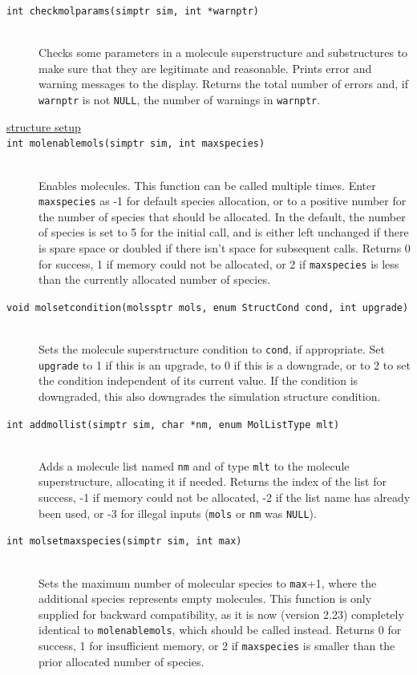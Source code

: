 \documentclass {scrbook}
\newcommand {\ttt} {\texttt}
\begin{document}
\begin{description}
\item[\ttt{int checkmolparams(simptr sim, int *warnptr)}]
\hfill \\
Checks some parameters in a molecule superstructure and substructures to make sure that they are legitimate and reasonable. Prints error and warning messages to the display. Returns the total number of errors and, if \ttt{warnptr} is not \ttt{NULL}, the number of warnings in \ttt{warnptr}.

\item[\underline{structure setup}]

\item[\ttt{int molenablemols(simptr sim, int maxspecies)}]
\hfill \\
Enables molecules. This function can be called multiple times. Enter \ttt{maxspecies} as -1 for default species allocation, or to a positive number for the number of species that should be allocated. In the default, the number of species is set to 5 for the initial call, and is either left unchanged if there is spare space or doubled if there isn't space for subsequent calls. Returns 0 for success, 1 if memory could not be allocated, or 2 if \ttt{maxspecies} is less than the currently allocated number of species.

\item[\ttt{void molsetcondition(molssptr mols, enum StructCond cond, int upgrade)}]
\hfill \\
Sets the molecule superstructure condition to \ttt{cond}, if appropriate. Set \ttt{upgrade} to 1 if this is an upgrade, to 0 if this is a downgrade, or to 2 to set the condition independent of its current value. If the condition is downgraded, this also downgrades the simulation structure condition.

\item[\ttt{int addmollist(simptr sim, char *nm, enum MolListType mlt)}]
\hfill \\
Adds a molecule list named \ttt{nm} and of type \ttt{mlt} to the molecule superstructure, allocating it if needed. Returns the index of the list for success, -1 if memory could not be allocated, -2 if the list name has already been used, or -3 for illegal inputs (\ttt{mols} or \ttt{nm} was \ttt{NULL}).

\item[\ttt{int molsetmaxspecies(simptr sim, int max)}]
\hfill \\
Sets the maximum number of molecular species to \ttt{max}+1, where the additional species represents empty molecules. This function is only supplied for backward compatibility, as it is now (version 2.23) completely identical to \ttt{molenablemols}, which should be called instead. Returns 0 for success, 1 for insufficient memory, or 2 if \ttt{maxspecies} is smaller than the prior allocated number of species.


\end{description}
\end{document}
